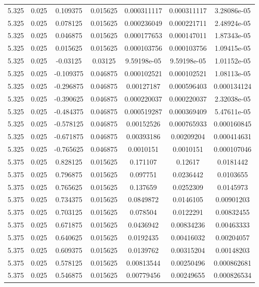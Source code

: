 \begin{flushleft}
\begin{longtable}{ccccccc}
5.325 & 0.025 & 0.109375 & 0.015625 & 0.000311117 & 0.000311117 & 3.28086e-05  \\ 
5.325 & 0.025 & 0.078125 & 0.015625 & 0.000236049 & 0.000221711 & 2.48924e-05  \\ 
5.325 & 0.025 & 0.046875 & 0.015625 & 0.000177653 & 0.000147011 & 1.87343e-05  \\ 
5.325 & 0.025 & 0.015625 & 0.015625 & 0.000103756 & 0.000103756 & 1.09415e-05  \\ 
5.325 & 0.025 & -0.03125 & 0.03125 & 9.59198e-05 & 9.59198e-05 & 1.01152e-05  \\ 
5.325 & 0.025 & -0.109375 & 0.046875 & 0.000102521 & 0.000102521 & 1.08113e-05  \\ 
5.325 & 0.025 & -0.296875 & 0.046875 & 0.00127187 & 0.000596403 & 0.000134124  \\ 
5.325 & 0.025 & -0.390625 & 0.046875 & 0.000220037 & 0.000220037 & 2.32038e-05  \\ 
5.325 & 0.025 & -0.484375 & 0.046875 & 0.000519287 & 0.000369409 & 5.47611e-05  \\ 
5.325 & 0.025 & -0.578125 & 0.046875 & 0.00152526 & 0.000765933 & 0.000160845  \\ 
5.325 & 0.025 & -0.671875 & 0.046875 & 0.00393186 & 0.00209204 & 0.000414631  \\ 
5.325 & 0.025 & -0.765625 & 0.046875 & 0.0010151 & 0.0010151 & 0.000107046  \\ 
5.375 & 0.025 & 0.828125 & 0.015625 & 0.171107 & 0.12617 & 0.0181442  \\ 
5.375 & 0.025 & 0.796875 & 0.015625 & 0.097751 & 0.0236442 & 0.0103655  \\ 
5.375 & 0.025 & 0.765625 & 0.015625 & 0.137659 & 0.0252309 & 0.0145973  \\ 
5.375 & 0.025 & 0.734375 & 0.015625 & 0.0849872 & 0.0146105 & 0.00901203  \\ 
5.375 & 0.025 & 0.703125 & 0.015625 & 0.078504 & 0.0122291 & 0.00832455  \\ 
5.375 & 0.025 & 0.671875 & 0.015625 & 0.0436942 & 0.00834236 & 0.00463333  \\ 
5.375 & 0.025 & 0.640625 & 0.015625 & 0.0192435 & 0.00416032 & 0.00204057  \\ 
5.375 & 0.025 & 0.609375 & 0.015625 & 0.0139762 & 0.00315204 & 0.00148203  \\ 
5.375 & 0.025 & 0.578125 & 0.015625 & 0.00813544 & 0.00250496 & 0.000862681  \\ 
5.375 & 0.025 & 0.546875 & 0.015625 & 0.00779456 & 0.00249655 & 0.000826534  \\ 

\end{longtable}
\end{flushleft}
